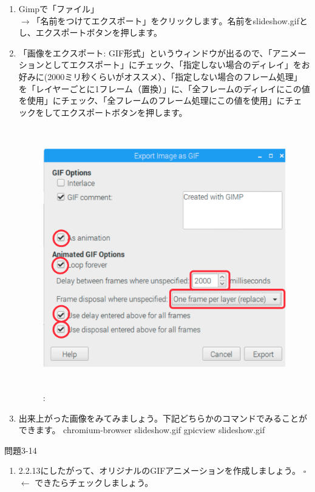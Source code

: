 \documentclass[a4paper,dvipdfmx]{jarticle}
\begin{document}
\begin{enumerate}
\begin{enumerate}
\begin{figure}
\end{figure}
\item Gimpで「ファイル」$\rightarrow
「名前をつけてエクスポート」をクリックします。名前を$slideshow.gifとし、エクスポートボタンを押します。
\item 「画像をエクスポート:
GIF形式」というウィンドウが出るので、「アニメーションとしてエクスポート」にチェック、「指定しない場合のディレイ」をお好みに(2000ミリ秒くらいがオススメ）、「指定しない場合のフレーム処理」を「レイヤーごとに1フレーム（置換）」に、「全フレームのディレイにこの値を使用」にチェック、「全フレームのフレーム処理にこの値を使用」にチェックをしてエクスポートボタンを押します。
\begin{figure}
\centering
\caption[: ]{ \includegraphics[width=14.265cm,height=11.434cm]{text03-img/text03-img026.png} \newline
: }

\end{figure}
\item
出来上がった画像をみてみましょう。下記どちらかのコマンドでみることができます。\newline
chromium-browser slideshow.gif\newline
gpicview slideshow.gif
\end{enumerate}
\end{enumerate}
{\ttfamily
問題3-14}

\begin{enumerate}
\item
2.2.13にしたがって、オリジナルのGIFアニメーションを作成しましょう。\newline
${\square}$ $\leftarrow $
できたらチェックしましょう。
\end{enumerate}
\end{document}
